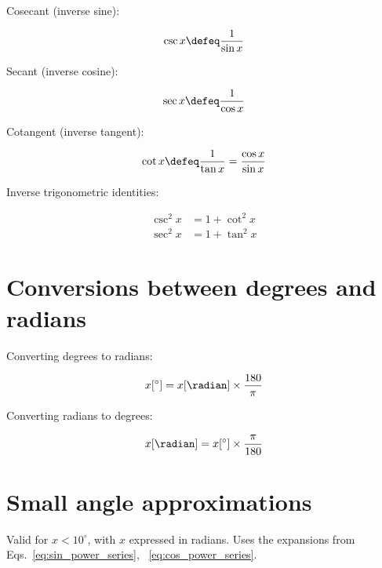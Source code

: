 Cosecant (inverse sine):

\begin{equation}
    \csc x \defeq \frac{1}{\sin x}
    \label{eq:cosec}
\end{equation}

Secant (inverse cosine):

\begin{equation}
    \sec x \defeq \frac{1}{\cos x}
    \label{eq:sec}
\end{equation}

Cotangent (inverse tangent):

\begin{equation}
    \cot x \defeq \frac{1}{\tan x} = \frac{\cos x}{\sin x}
    \label{eq:cot}
\end{equation}

Inverse trigonometric identities:

\begin{equation}
    \begin{aligned}
        \csc^2 x &= 1 + \cot^2 x\\
        \sec^2 x &= 1 + \tan^2 x
    \end{aligned}
    \label{eq:inverse_trig}
\end{equation}


\section{Conversions between degrees and radians}

Converting degrees to radians:

\begin{equation}
    x[^{\circ}] = x[\radian] \times \frac{180}{\pi}
\end{equation}

\noindent{}Converting radians to degrees:

\begin{equation}
    x[\radian] = x[^{\circ}] \times \frac{\pi}{180}
\end{equation}


\section{Small angle approximations}

Valid for $x < 10^{\circ}$, with $x$ expressed in radians. Uses the expansions from Eqs.~\ref{eq:sin_power_series}, ~\ref{eq:cos_power_series}.

\

